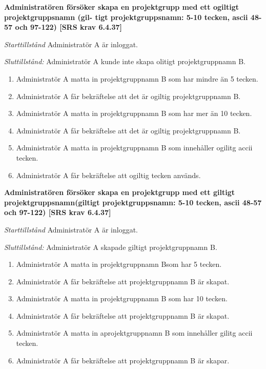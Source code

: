 \documentclass[a4paper]{article}
\begin{document}
\begin{FT} 

\item %
\textbf{Administratören försöker skapa en projektgrupp med ett ogiltigt projektgruppsnamn (gil- tigt projektgruppsnamn: 5-10 tecken, ascii 48-57 och 97-122) [SRS krav 6.4.37]}

\emph{Starttillstånd} Administratör A  är inloggat.

\emph{Sluttillstånd:} Administratör A kunde inte skapa olitigt projektgruppnamn B.

\begin{enumerate}
\item Administratör A matta in projektgruppnamn B som har mindre än 5 tecken.
\item Administratör A får bekräftelse att det är ogiltig projektgruppnamn B.
\item Administratör A matta in projektgruppnamn B som har mer än 10 tecken.
\item Administratör A får bekräftelse att det är ogiltig projektgruppnamn B.
\item Administratör A matta in projektgruppnamn B  som innehåller ogilitg accii tecken.
\item Administratör A får bekräftelse att ogiltig tecken används.
\end{enumerate}

\item %
\textbf{Administratören försöker skapa en projektgrupp med ett giltigt projektgruppsnamn(giltigt projektgruppsnamn: 5-10 tecken, ascii 48-57 och 97-122) [SRS krav 6.4.37]}

\emph{Starttillstånd} Administratör A  är inloggat.

\emph{Sluttillstånd:} Administratör A  skapade  giltigt projektgruppnamn B.

\begin{enumerate}
\item Administratör A matta in projektgruppnamn Bsom har 5 tecken.
\item Administratör A får bekräftelse att projektgruppnamn B är skapat.
\item Administratör A matta in projektgruppnamn B som har 10 tecken.
\item Administratör A får bekräftelse att projektgruppnamn B är skapat.
\item Administratör A matta in aprojektgruppnamn B som innehåller gilitg accii tecken.
\item Administratör A får bekräftelse att projektgruppnamn B är skapar.
\end{enumerate}


\end{FT}
\end{document}
